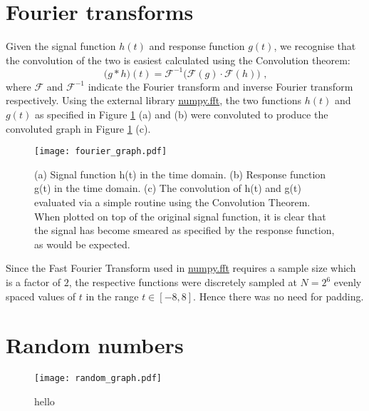 \documentclass[paper=a4, fontsize=11pt]{scrartcl}
\begin{document}
\section{Fourier transforms}
Given the signal function $h(t)$ and response function $g(t)$, we recognise that the convolution of the two is easiest calculated using the Convolution theorem:
\begin{equation}
\big(g*h\big)(t) = \mathcal{F}^{-1} \Big( \mathcal{F} (g) \cdot \mathcal{F} (h) \Big) \text{ ,}
\end{equation}
where $\mathcal{F}$ and $\mathcal{F}^{-1}$ indicate the Fourier transform and inverse Fourier transform respectively. Using the external library \url{numpy.fft}, the two functions $h(t)$ and $g(t)$ as specified in Figure \ref{fourier graph} (a) and (b) were convoluted to produce the convoluted graph in Figure \ref{fourier graph} (c). 

\begin{figure}
	\centering
	\texttt{[image: fourier\_graph.pdf]}
	\caption{\footnotesize{(a) Signal function h(t) in the time domain. (b) Response function g(t) in the time domain. (c) The convolution of h(t) and g(t) evaluated via a simple routine using the Convolution Theorem. When plotted on top of the original signal function, it is clear that the signal has become smeared as specified by the response function, as would be expected.}}
	\label{fourier graph}
\end{figure}

Since the Fast Fourier Transform used in \url{numpy.fft} requires a sample size which is a factor of $2$, the respective functions were discretely sampled at $N=2^{6}$ evenly spaced values of $t$ in the range $t \in [-8,8]$. Hence there was no need for padding. 

\section{Random numbers}

\begin{figure}
	\centering
	\texttt{[image: random\_graph.pdf]}
	\caption{\footnotesize{hello}}
	\label{random graph}
\end{figure}

\end{document}
